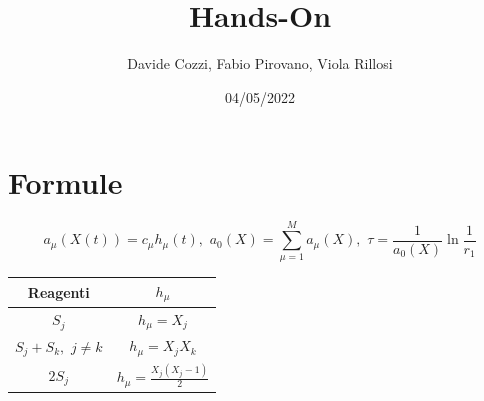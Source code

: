 \documentclass{article}
\title{Hands-On}
\author{Davide Cozzi, Fabio Pirovano, Viola Rillosi}
\date{04/05/2022}
\begin{document}
\maketitle
\section*{Formule}
\[a_\mu(X(t))=c_\mu h_\mu(t),\,\,
  a_0(X)=\sum_{\mu=1}^Ma_\mu(X),\,\,
  \tau=\frac{1}{a_0(X)}\ln\frac{1}{r_1}\]
\begin{table}[H]
    \centering
    \begin{tabular}{c|c}
      Reagenti & $h_\mu$\\
      \hline
      \hline
      $S_j$ & $h_\mu=X_j$\\
      $S_j+S_k, \,\,j\neq k$ & $h_\mu=X_jX_k$\\
      $2S_j$ & $h_\mu=\frac{X_j(X_j-1)}{2}$
    \end{tabular}
  \end{table}
\end{document}
